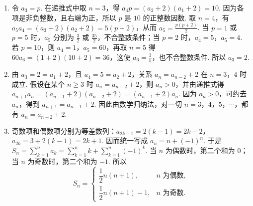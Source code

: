 \begin{solution}
\begin{enumerate}
\item 令 \(a_{3}=p\). 在递推式中取 \(n=3\)，得 \(a_{4}p=(a_{2}+2)(a_{1}+2)=10\). 因为各项是非负整数，且右端为正，所以 \(p\) 是 \(10\) 的正整数因数. 取 \(n=4\)，有
\(a_{5}a_{4}=(a_{3}+2)(a_{2}+2)=5(p+2)\)，从而 \(a_{5}=\frac{p(p+2)}{2}\). 当 \(p=1\) 或 \(p=5\) 时，\(a_{5}\) 分别为 \(\frac{3}{2}\) 或 \(\frac{35}{2}\)，不合整数条件；当 \(p=2\) 时，\(a_{4}=5\)，\(a_{5}=4\). 若 \(p=10\)，则 \(a_{4}=1\)，\(a_{5}=60\)，再取 \(n=5\) 得 \(60a_{6}=(1+2)(10+2)=36\)，这使 \(a_{6}=\frac{3}{5}\)，也不合整数条件. 所以 \(a_{3}=2\).
\item 由 \(a_{3}=2=a_{1}+2\)，且 \(a_{4}=5=a_{2}+2\)，关系 \(a_{n}=a_{n-2}+2\) 在 \(n=3\)，\(4\) 时成立. 假设在某个 \(n\geqslant3\) 时 \(a_{n}=a_{n-2}+2\)，则 \(a_{n}>0\)，并由递推式得
\(a_{n+1}a_{n}=(a_{n-1}+2)(a_{n-2}+2)=(a_{n-1}+2)a_{n}\). 因为 \(a_{n}>0\)，可约去 \(a_{n}\)，得到 \(a_{n+1}=a_{n-1}+2\). 因此由数学归纳法，对一切 \(n=3\)，\(4\)，\(5\)，\(\cdots\)，都有 \(a_{n}=a_{n-2}+2\).
\item 奇数项和偶数项分别为等差数列：\(a_{2k-1}=2(k-1)=2k-2\)，\(a_{2k}=3+2(k-1)=2k+1\). 因而统一写成 \(a_{n}=n+(-1)^{n}\). 于是
\(S_{n}=\sum_{k=1}^{n}a_{k}=\sum_{k=1}^{n}k+\sum_{k=1}^{n}(-1)^{k}\). 当 \(n\) 为偶数时，第二个和为 \(0\)；当 \(n\) 为奇数时，第二个和为 \(-1\). 所以
\[
S_{n}=\begin{cases}
\dfrac{1}{2}n(n+1),& n\text{ 为偶数},\\
\dfrac{1}{2}n(n+1)-1,& n\text{ 为奇数}.
\end{cases}
\]
\end{enumerate}
\end{solution}
